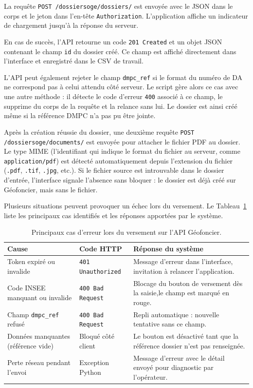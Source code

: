 La requête \texttt{POST /dossiersoge/dossiers/} est envoyée avec le JSON dans le corps et le jeton dans l'en-tête \texttt{Authorization}. L'application affiche un indicateur de chargement jusqu'à la réponse du serveur.

En cas de succès, l'API retourne un code \texttt{201 Created} et un objet JSON contenant le champ \texttt{id} du dossier créé. Ce champ est affiché directement dans l'interface et enregistré dans le CSV de travail.

L'API peut également rejeter le champ \texttt{dmpc\_ref} si le format du numéro de DA ne correspond pas à celui attendu côté serveur. Le script gère alors ce cas avec une autre méthode : il détecte le code d'erreur \texttt{400} associé à ce champ, le supprime du corps de la requête et la relance sans lui. Le dossier est ainsi créé même si la référence DMPC n'a pas pu être jointe.

Après la création réussie du dossier, une deuxième requête \texttt{POST /dossiersoge/documents/} est envoyée pour attacher le fichier PDF au dossier. Le type MIME (l'identifiant qui indique le format du fichier au serveur, comme \texttt{application/pdf}) est détecté automatiquement depuis l'extension du fichier (\texttt{.pdf}, \texttt{.tif}, \texttt{.jpg}, etc.). Si le fichier source est introuvable dans le dossier d'entrée, l'interface signale l'absence sans bloquer : le dossier est déjà créé sur Géofoncier, mais sans le fichier.

Plusieurs situations peuvent provoquer un échec lors du versement. Le Tableau~\ref{tab:erreurs_api} liste les principaux cas identifiés et les réponses apportées par le système.


\begin{table}[H]
  \centering
  \caption{Principaux cas d'erreur lors du versement sur l'API Géofoncier.}
  \label{tab:erreurs_api}
  \small
  \begin{tabular}{p{3.5cm}p{3.5cm}p{5cm}}
    \toprule
    \textbf{Cause} & \textbf{Code HTTP} & \textbf{Réponse du système} \\
    \midrule
    Token expiré ou invalide & \texttt{401 Unauthorized} & Message d'erreur dans l'interface, invitation à relancer l'application. \\
    \addlinespace
    Code INSEE manquant ou invalide & \texttt{400 Bad Request} & Blocage du bouton de versement dès la saisie,le champ est marqué en rouge. \\
    \addlinespace
    Champ \texttt{dmpc\_ref} refusé & \texttt{400 Bad Request} & Repli automatique : nouvelle tentative sans ce champ. \\
    \addlinespace
    Données manquantes (référence vide) & Bloqué côté client & Le bouton est désactivé tant que la référence dossier n'est pas renseignée. \\
    \addlinespace
    Perte réseau pendant l'envoi & Exception Python & Message d'erreur avec le détail envoyé pour diagnostic par l'opérateur. \\
    \bottomrule
  \end{tabular}
\end{table}

